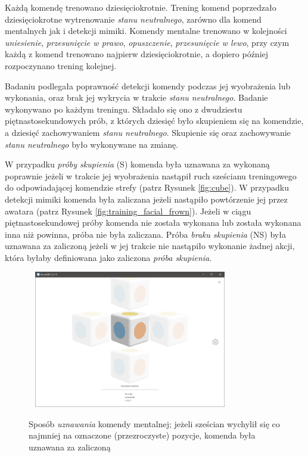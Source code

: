 \documentclass[skorowidz,skroty]{dyplomWEZUT}
\begin{document}
Każdą komendę trenowano dziesięciokrotnie. Trening komend poprzedzało dziesięciokrotne wytrenowanie \textit{stanu neutralnego}, zarówno dla komend mentalnych jak i detekcji mimiki. Komendy mentalne trenowano w kolejności \textit{uniesienie}, \textit{przesunięcie w prawo}, \textit{opuszczenie}, \textit{przesunięcie w lewo}, przy czym każdą z komend trenowano najpierw dziesięciokrotnie, a dopiero później rozpoczynano trening kolejnej.

Badaniu podlegała poprawność detekcji komendy podczas jej wyobrażenia lub wykonania, oraz brak jej wykrycia w trakcie \textit{stanu neutralnego}. Badanie wykonywano po każdym treningu. Składało się ono z dwudziestu piętnastosekundowych prób, z których dziesięć było skupieniem się na komendzie, a dziesięć zachowywaniem \textit{stanu neutralnego}. Skupienie się oraz zachowywanie \textit{stanu neutralnego} było wykonywane na zmianę.

W przypadku \textit{próby skupienia} (S) komenda była uznawana za wykonaną poprawnie jeżeli w trakcie jej wyobrażenia nastąpił ruch sześcianu treningowego do odpowiadającej komendzie strefy (patrz Rysunek \vref{fig:cube}). W przypadku detekcji mimiki komenda była zaliczana jeżeli nastąpiło powtórzenie jej przez awatara (patrz Rysunek \vref{fig:training_facial_frown}). Jeżeli w ciągu piętnastosekundowej próby komenda nie została wykonana lub została wykonana inna niż powinna, próba nie była zaliczana. Próba \textit{braku skupienia} (NS) była uznawana za zaliczoną jeżeli w jej trakcie nie nastąpiło wykonanie żadnej akcji, która byłaby definiowana jako zaliczona \textit{próba skupienia}.

\begin{figure}[htbp]
	\centering\includegraphics[height=6cm,width=0.8\textwidth,keepaspectratio]{graphic/emotivbci}\\
	\caption[Sposób \textit{uznawania} komendy mentalnej]{Sposób \textit{uznawania} komendy mentalnej; jeżeli sześcian wychylił się co najmniej na oznaczone (przezroczyste) pozycje, komenda była uznawana za zaliczoną\label{fig:cube}}
\end{figure}
\end{document}
